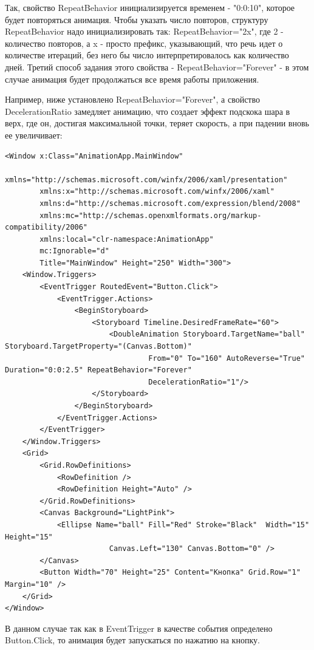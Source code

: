 Так, свойство RepeatBehavior инициализируется временем - "0:0:10", которое будет повторяться анимация. Чтобы указать число повторов, структуру RepeatBehavior надо инициализировать так: RepeatBehavior="2x", где 2 - количество повторов, а x - просто префикс, указывающий, что речь идет о количестве итераций, без него бы число интерпретировалось как количество дней. Третий способ задания этого свойства - RepeatBehavior="Forever" - в этом случае анимация будет продолжаться все время работы приложения.

Например, ниже установлено RepeatBehavior="Forever", а свойство DecelerationRatio замедляет анимацию, что создает эффект подскока шара в верх, где он, достигая максимальной точки, теряет скорость, а при падении вновь ее увеличивает:

\begin{verbatim}
<Window x:Class="AnimationApp.MainWindow"
        xmlns="http://schemas.microsoft.com/winfx/2006/xaml/presentation"
        xmlns:x="http://schemas.microsoft.com/winfx/2006/xaml"
        xmlns:d="http://schemas.microsoft.com/expression/blend/2008"
        xmlns:mc="http://schemas.openxmlformats.org/markup-compatibility/2006"
        xmlns:local="clr-namespace:AnimationApp"
        mc:Ignorable="d"
        Title="MainWindow" Height="250" Width="300">
    <Window.Triggers>
        <EventTrigger RoutedEvent="Button.Click">
            <EventTrigger.Actions>
                <BeginStoryboard>
                    <Storyboard Timeline.DesiredFrameRate="60">
                        <DoubleAnimation Storyboard.TargetName="ball" Storyboard.TargetProperty="(Canvas.Bottom)"
                                 From="0" To="160" AutoReverse="True" Duration="0:0:2.5" RepeatBehavior="Forever"
                                 DecelerationRatio="1"/>
                    </Storyboard>
                </BeginStoryboard>
            </EventTrigger.Actions>
        </EventTrigger>
    </Window.Triggers>
    <Grid>
        <Grid.RowDefinitions>
            <RowDefinition />
            <RowDefinition Height="Auto" />
        </Grid.RowDefinitions>
        <Canvas Background="LightPink">
            <Ellipse Name="ball" Fill="Red" Stroke="Black"  Width="15" Height="15"
                        Canvas.Left="130" Canvas.Bottom="0" />
        </Canvas>
        <Button Width="70" Height="25" Content="Кнопка" Grid.Row="1" Margin="10" />
    </Grid>
</Window>
\end{verbatim}

В данном случае так как в EventTrigger в качестве события определено Button.Click, то анимация будет запускаться по нажатию на кнопку.


